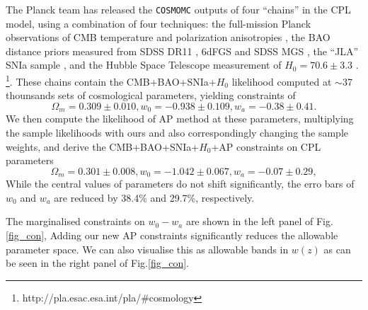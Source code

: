 \documentclass[prl,twocolumn,superscriptaddress,aps,amsmath,amssymb,nofootinbib,altaffilletter]{revtex4}
\begin{document}
The Planck team has released the {\texttt {COSMOMC}} \citep{LB2002} outputs of four ``chains'' in the CPL model, 
using a combination of four techniques:
the full-mission Planck observations of CMB temperature and polarization anisotropies \cite{Planck2015},
the BAO distance priors measured from SDSS DR11 \citep{Anderson2013}, 6dFGS \citep{6dFGS} and SDSS MGS \citep{MGS},
the ``JLA'' SNIa sample \citep{JLA},
and the Hubble Space Telescope measurement of $H_0=70.6\pm3.3$ \cite{Riess2011,E14H0}.
\footnote{http://pla.esac.esa.int/pla/\#cosmology}.
These chains contain the CMB+BAO+SNIa+$H_0$ likelihood computed at $\sim$37 thounsands sets of cosmological parameters,
yielding constraints of 
\begin{equation}
 \Omega_m = 0.309 \pm 0.010, w_0 = -0.938 \pm 0.109, w_a = -0.38 \pm 0.41.
\end{equation}
We then compute the likelihood of AP method at these parameters, 
multiplying the sample likelihoods with ours and also correspondingly changing the sample weights,
and derive the CMB+BAO+SNIa+$H_0$+AP constraints on CPL parameters
\begin{equation}
\Omega_m = 0.301 \pm 0.008, w_0 = -1.042 \pm 0.067, w_a = -0.07 \pm 0.29,    
\end{equation}
While the central values of parameters do not shift significantly,
the erro bars of $w_0$ and $w_a$ are reduced by 38.4\% and 29.7\%, respectively.%

The marginalised constraints on $w_0-w_a$ are shown in the left panel of Fig.\ref{fig_con}, 
Adding our new AP constraints significantly reduces the allowable parameter space. 
We can also visualise this as allowable bands in $w(z)$ as can be seen in the right panel of Fig.\ref{fig_con}.  
\end{document}
